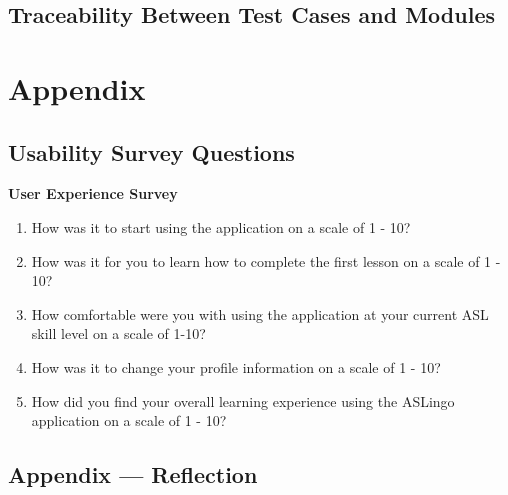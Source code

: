 \documentclass[12pt, titlepage]{article}
\begin{document}
\subsection{Traceability Between Test Cases and Modules}

				




\newpage

\section{Appendix}

\subsection{Usability Survey Questions}

\textbf{User Experience Survey}\label{appen}

\begin{enumerate}

\item How was it to start using the application on a scale of 1 - 10? \newline [ 1 = very hard to start, 10 = very easy to start]
\item How was it for you to learn how to complete the first lesson on a scale of 1 - 10? \newline [ 1 = very hard to learn, 10 = very easy to learn]
\item How comfortable were you with using the application at your current ASL skill level on a scale of 1-10? \newline [ 1 = very uncomfortable to use, 10 = very comfortable to use]
\item How was it to change your profile information on a scale of 1 - 10? \newline [ 1 = very hard to change, 10 = very easy to change]
\item How did you find your overall learning experience using the ASLingo application on a scale of 1 - 10? \newline [ 1 = very bad experience, 10 = very good experience]

\end{enumerate}

\subsection{Appendix --- Reflection}
\end{document}
